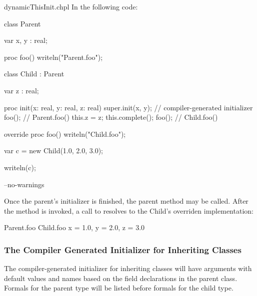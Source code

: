\begin{chapelexample}{dynamicThisInit.chpl}
In the following code:
\begin{chapel}
class Parent {
  var x, y : real;

  proc foo() {
    writeln("Parent.foo");
  }
}

class Child : Parent {
  var z : real;

  proc init(x: real, y: real, z: real) {
    super.init(x, y); // compiler-generated initializer
    foo(); // Parent.foo()
    this.z = z;
    this.complete();
    foo(); // Child.foo()
  }

  override proc foo() {
    writeln("Child.foo");
  }
}

var c = new Child(1.0, 2.0, 3.0);
\end{chapel}
\begin{chapelpost}
writeln(c);
\end{chapelpost}
\begin{chapelcompopts}
--no-warnings
\end{chapelcompopts}
Once the parent's initializer is finished, the parent method
 may be called. After the  method is invoked, a call to 
resolves to the Child's overriden implementation:
\begin{chapelprintoutput}{}
Parent.foo
Child.foo
{x = 1.0, y = 2.0, z = 3.0}
\end{chapelprintoutput}
\end{chapelexample}

\subsubsection{The Compiler Generated Initializer for Inheriting Classes}
\label{The_Compiler_Generated_Initializer_for_Inheriting_Classes}

The compiler-generated initializer for inheriting classes will have arguments
with default values and names based on the field declarations in the parent
class. Formals for the parent type will be listed before formals for the
child type.

